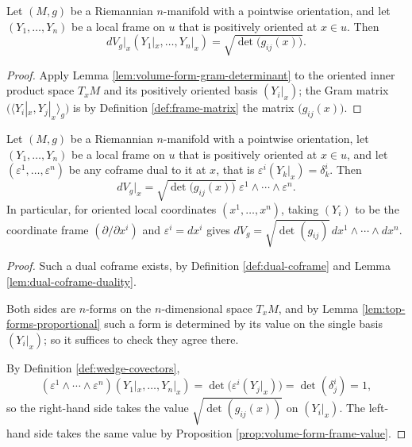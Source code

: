 \begin{proposition}
\label{prop:volume-form-frame-value}
\leanok
{}
Let $(M,g)$ be a Riemannian $n$-manifold with a pointwise orientation, and let $(Y_1,\ldots,Y_n)$
be a local frame on $u$ that is positively oriented at $x \in u$. Then
\[
dV_g|_x(Y_1|_x, \ldots, Y_n|_x) = \sqrt{\det\bigl(g_{ij}(x)\bigr)} .
\]
\end{proposition}

\begin{proof}
\leanok
{}
Apply Lemma \ref{lem:volume-form-gram-determinant} to the oriented inner product space $T_x M$ and
its positively oriented basis $(Y_i|_x)$; the Gram matrix $\bigl(\langle Y_i|_x, Y_j|_x\rangle_g\bigr)$
is by Definition \ref{def:frame-matrix} the matrix $\bigl(g_{ij}(x)\bigr)$.
\end{proof}

\begin{proposition}
\label{prop:volume-form-coordinate-formula}
\leanok
{}
Let $(M,g)$ be a Riemannian $n$-manifold with a pointwise orientation, let $(Y_1,\ldots,Y_n)$ be a
local frame on $u$ that is positively oriented at $x \in u$, and let $(\varepsilon^1,\ldots,
\varepsilon^n)$ be any coframe dual to it at $x$, that is $\varepsilon^i(Y_k|_x) = \delta^i_k$.
Then
\[
dV_g|_x = \sqrt{\det\bigl(g_{ij}(x)\bigr)} \; \varepsilon^1 \wedge \cdots \wedge \varepsilon^n .
\]
In particular, for oriented local coordinates $(x^1,\ldots,x^n)$, taking $(Y_i)$ to be the
coordinate frame $(\partial/\partial x^i)$ and $\varepsilon^i = dx^i$ gives
$dV_g = \sqrt{\det(g_{ij})}\, dx^1 \wedge \cdots \wedge dx^n$.
\end{proposition}

\begin{proof}
\leanok
{}
Such a dual coframe exists, by Definition \ref{def:dual-coframe} and Lemma
\ref{lem:dual-coframe-duality}.

Both sides are $n$-forms on the $n$-dimensional space $T_x M$, and by Lemma
\ref{lem:top-forms-proportional} such a form is determined by its value on the single basis
$(Y_i|_x)$; so it suffices to check they agree there.

By Definition \ref{def:wedge-covectors},
\[
(\varepsilon^1 \wedge \cdots \wedge \varepsilon^n)(Y_1|_x,\ldots,Y_n|_x)
  = \det\bigl(\varepsilon^i(Y_j|_x)\bigr) = \det(\delta^i_j) = 1,
\]
so the right-hand side takes the value $\sqrt{\det(g_{ij}(x))}$ on $(Y_i|_x)$. The left-hand side
takes the same value by Proposition \ref{prop:volume-form-frame-value}.
\end{proof}

